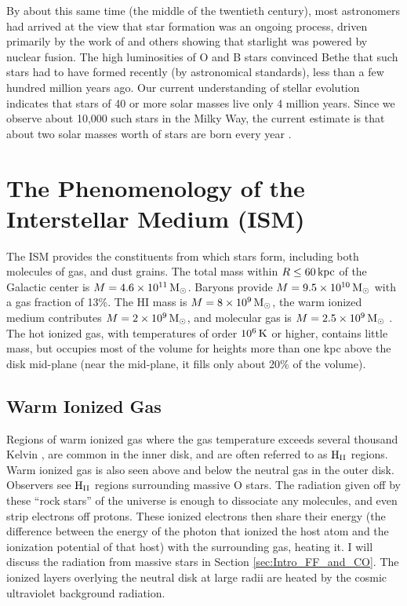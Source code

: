 \documentclass[../dissertation.tex]{subfiles}
\begin{document}
By about this same time (the middle of the twentieth century), most astronomers had arrived at the view that star formation was an ongoing process, 
driven primarily by the work of \citet{1939PhRv...55..434B}
and others showing that starlight was powered by nuclear fusion. 
The high luminosities of O and B stars convinced Bethe that such stars had to have formed recently (by astronomical standards), less than a few hundred million years ago. 
Our current understanding of stellar evolution indicates that stars of 40 or more solar masses live only 4 million years. 
Since we observe about 10,000 such stars in the Milky Way, the current estimate is that about two solar masses worth of stars are born every year \citep{2011AJ....142..197C}. 

\section{The Phenomenology of the Interstellar Medium (ISM)}
The ISM provides the constituents from which stars form, including both molecules of gas, and dust grains. 
The total mass within $R \le 60 \,\rm kpc$ of the Galactic center is $M = 4.6 \times 10^{11} {\,\rm M}_\odot$. 
Baryons provide $M = 9.5 \times 10^{10} {\,\rm M}_\odot$ with a gas fraction of 13\%. 
The HI mass is $M = 8 \times 10^9 {\,\rm M}_\odot$, the warm ionized medium contributes $M = 2 \times 10^9 {\,\rm M}_\odot$, and molecular gas is $M = 2.5 \times 10^9 {\,\rm M}_\odot$ \citep[p. 35]{2009ARA&A..47...27K}. The hot ionized gas, with temperatures of order $10^6\,{\rm K}$ or higher, contains little mass, but occupies most of the volume for heights more than one kpc above the disk mid-plane (near the mid-plane, it fills only about 20\% of the volume).

\subsection{Warm Ionized Gas}
Regions of warm ionized gas where the gas temperature  exceeds several thousand Kelvin \citep[p. 47]{2009ARA&A..47...27K}, are common in the inner disk, and are often referred to as ${\rm H}_{\rm II}$ regions. Warm ionized gas is also seen above and below the neutral gas in the outer disk.
Observers see ${\rm H}_{\rm II}$ regions surrounding massive O stars. 
The radiation given off by these ``rock stars'' of the universe is enough to dissociate any molecules, and even strip electrons off protons. These ionized electrons then share their energy (the difference between the energy of the photon that ionized the host atom and the ionization potential of that host) with the surrounding gas, heating it.
I will discuss the radiation from massive stars in Section \ref{sec:Intro_FF_and_CO}. The ionized layers overlying the neutral disk at large radii are heated by the cosmic ultraviolet background radiation.
\end{document}

